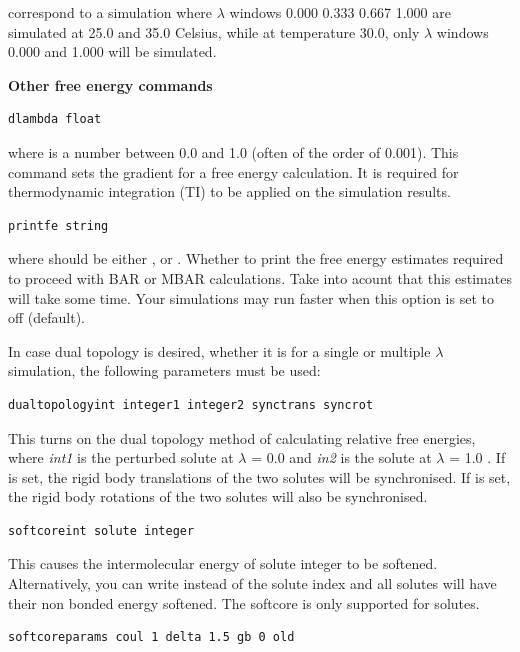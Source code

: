 \documentclass[letterpaper,10pt,english]{manual}
\begin{document}
correspond to a simulation where $\lambda$ windows 0.000 0.333 0.667 1.000 are simulated at 25.0 and 35.0 Celsius, while at temperature 30.0, only $\lambda$ windows 0.000 and 1.000 will be simulated.

\textbf{Other free energy commands}
\begin{Verbatim}[commandchars=@\[\]]
dlambda float
\end{Verbatim}

where  is a number between 0.0 and 1.0 (often of the order of 0.001). This command sets the gradient for a free energy calculation. It is required for thermodynamic integration (TI) to be applied on the simulation results.
\begin{Verbatim}[commandchars=@\[\]]
printfe string
\end{Verbatim}

where  should be either ,  or . Whether to print the free energy estimates required to proceed with BAR or MBAR calculations. Take into acount that this estimates will take some time. Your simulations may run faster when this option is set to off (default).

In case dual topology is desired, whether it is for a single or multiple $\lambda$ simulation, the following parameters must be used:

\begin{Verbatim}[commandchars=@\[\]]
dualtopologyint integer1 integer2 synctrans syncrot
\end{Verbatim}

This turns on the dual topology method of calculating relative free energies, where \emph{int1} is the perturbed solute at $\lambda$ = 0.0 and \emph{in2} is the solute at $\lambda$ = 1.0 . If  is set, the rigid body translations of the two solutes will be synchronised. If  is set, the rigid body rotations of the two solutes will also be synchronised.
\begin{Verbatim}[commandchars=@\[\]]
softcoreint solute integer
\end{Verbatim}

This causes the intermolecular energy of solute integer to be softened. Alternatively, you can write  instead of the solute index and all solutes will have their non bonded energy softened. The softcore is only supported for solutes.
\begin{Verbatim}[commandchars=@\[\]]
softcoreparams coul 1 delta 1.5 gb 0 old
\end{Verbatim}
\end{document}
